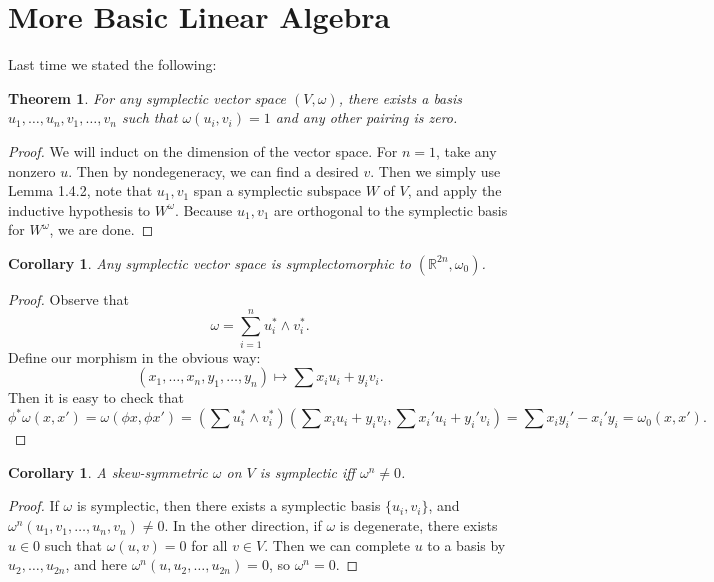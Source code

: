 \documentclass[leqno, openany]{memoir}
\newtheorem{cor}[thm]{Corollary}
\theoremstyle{definition}
\theoremstyle{remark}
\theoremstyle{plain}
\newtheorem*{thm*}{Theorem}
\theoremstyle{definition}
\theoremstyle{remark}
\newcommand{\R}{\mathbb{R}}
\begin{document}
\section{More Basic Linear Algebra}%
\label{sec:more_basic_linear_algebra}

Last time we stated the following:
\begin{thm*}
    For any symplectic vector space $(V, \omega)$, there exists a basis $u_1, \ldots, u_n, v_1, \ldots, v_n$ such that $\omega(u_i, v_i) = 1$ and any other pairing is zero.
\end{thm*}

\begin{proof}
    We will induct on the dimension of the vector space. For $n = 1$, take any nonzero $u$. Then by nondegeneracy, we can find a desired $v$. Then we simply use Lemma 1.4.2, note that $u_1, v_1$ span a symplectic subspace $W$ of $V$, and apply the inductive hypothesis to $W^{\omega}$. Because $u_1, v_1$ are orthogonal to the symplectic basis for $W^{\omega}$, we are done.
\end{proof}

\begin{cor}
    Any symplectic vector space is symplectomorphic to $(\R^{2n}, \omega_0)$.
\end{cor}

\begin{proof}
    Observe that 
    \[ \omega = \sum_{i=1}^n u_i^* \wedge v_i^*. \]
    Define our morphism in the obvious way:
    \[ (x_1, \ldots, x_n, y_1, \ldots, y_n) \mapsto \sum x_i u_i + y_i v_i.\]
    Then it is easy to check that
    \[ \phi^* \omega (x,x') = \omega(\phi x, \phi x') = \left( \sum u_i^* \wedge v_i^* \right) \left( \sum x_i u_i + y_i v_i, \sum x_i' u_i + y_i' v_i \right) = \sum x_i y_i' - x_i' y_i = \omega_0(x,x').\]
\end{proof}

\begin{cor}
    A skew-symmetric $\omega$ on $V$ is symplectic iff $\omega^n \neq 0$.
\end{cor}

\begin{proof}
    If $\omega$ is symplectic, then there exists a symplectic basis $\{ u_i, v_i \}$, and $\omega^n(u_1, v_1, \ldots, u_n, v_n) \neq 0$. In the other direction, if $\omega$ is degenerate, there exists $u \in 0$ such that $\omega(u,v) = 0$ for all $v \in V$. Then we can complete $u$ to a basis by $u_2, \ldots, u_{2n}$, and here $\omega^n(u, u_2, \ldots, u_{2n}) = 0$, so $\omega^n = 0$.
\end{proof}
\end{document}
